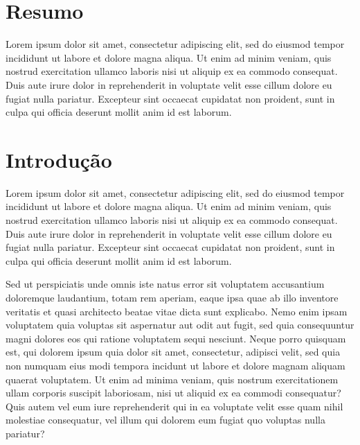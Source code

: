 \documentclass[a0,portrait]{a0poster}
\begin{document}
\begin{mdframed}[style=MyFrame]
\begin{multicols}{2}
			
			
			\section{Resumo}
			Lorem ipsum dolor sit amet, consectetur adipiscing elit, sed do eiusmod tempor incididunt ut labore et dolore magna aliqua. Ut enim ad minim veniam, quis nostrud exercitation ullamco laboris nisi ut aliquip ex ea commodo consequat. Duis aute irure dolor in reprehenderit in voluptate velit esse cillum dolore eu fugiat nulla pariatur. Excepteur sint occaecat cupidatat non proident, sunt in culpa qui officia deserunt mollit anim id est laborum.
			
			
			\section{Introdução}\label{section:1}
			
			Lorem ipsum dolor sit amet, consectetur adipiscing elit, sed do eiusmod tempor incididunt ut labore et dolore magna aliqua. Ut enim ad minim veniam, quis nostrud exercitation ullamco laboris nisi ut aliquip ex ea commodo consequat. Duis aute irure dolor in reprehenderit in voluptate velit esse cillum dolore eu fugiat nulla pariatur. Excepteur sint occaecat cupidatat non proident, sunt in culpa qui officia deserunt mollit anim id est laborum.
			
			Sed ut perspiciatis unde omnis iste natus error sit voluptatem accusantium doloremque laudantium, totam rem aperiam, eaque ipsa quae ab illo inventore veritatis et quasi architecto beatae vitae dicta sunt explicabo. Nemo enim ipsam voluptatem quia voluptas sit aspernatur aut odit aut fugit, sed quia consequuntur magni dolores eos qui ratione voluptatem sequi nesciunt. Neque porro quisquam est, qui dolorem ipsum quia dolor sit amet, consectetur, adipisci velit, sed quia non numquam eius modi tempora incidunt ut labore et dolore magnam aliquam quaerat voluptatem. Ut enim ad minima veniam, quis nostrum exercitationem ullam corporis suscipit laboriosam, nisi ut aliquid ex ea commodi consequatur? Quis autem vel eum iure reprehenderit qui in ea voluptate velit esse quam nihil molestiae consequatur, vel illum qui dolorem eum fugiat quo voluptas nulla pariatur?
			

\end{multicols}
\end{mdframed}
\end{document}
